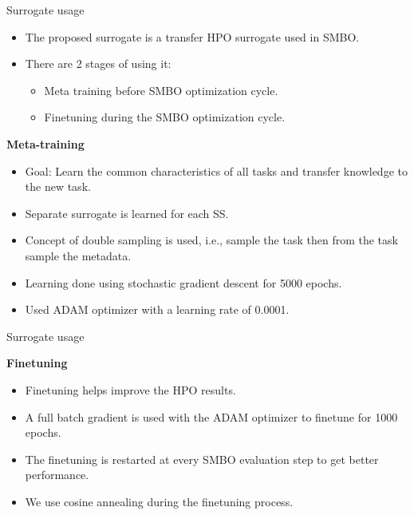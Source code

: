\documentclass{beamer}
\begin{document}
\begin{frame}[t]{Surrogate usage}

\begin{itemize}
\item The proposed surrogate is a transfer HPO surrogate used in SMBO.
\item There are 2 stages of using it:
\begin{itemize}
\item Meta training before SMBO optimization cycle.
\item Finetuning during the SMBO optimization cycle.
\end{itemize}
\end{itemize}

\textbf{Meta-training}
\begin{itemize}
\item Goal: Learn the common characteristics of all tasks and transfer knowledge to the new task.
\item Separate surrogate is learned for each SS.
\item Concept of double sampling is used, i.e., sample the task then from the task sample the metadata.
\item Learning done using stochastic gradient descent for 5000 epochs.
\item Used ADAM optimizer with a learning rate of 0.0001. 
\end{itemize}

\end{frame}


\begin{frame}[t]{Surrogate usage}

\textbf{Finetuning}
\begin{itemize}
\item Finetuning helps improve the HPO results.
\item A full batch gradient is used with the ADAM optimizer to finetune for 1000 epochs.
\item The finetuning is restarted at every SMBO evaluation step to get better performance.
\item We use cosine annealing during the finetuning process.
\end{itemize}

\end{frame}
\end{document}
